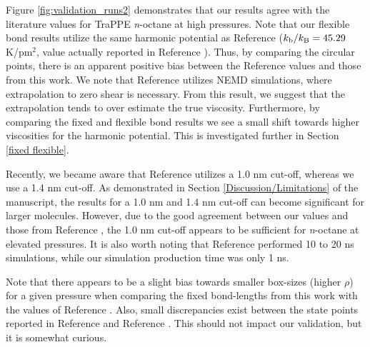 \documentclass[preprint,review,11pt]{elsarticle}
\begin{document}
	Figure \ref{fig:validation_runs2} demonstrates that our results agree with the literature values for TraPPE \textit{n}-octane at high pressures. Note that our flexible bond results utilize the same harmonic potential as Reference  ($k_{\rm b}/k_{\rm B} = 45.29$ K/pm$^2$, value actually reported in Reference ). Thus, by comparing the circular points, there is an apparent positive bias between the Reference  values and those from this work. We note that Reference  utilizes NEMD simulations, where extrapolation to zero shear is necessary. From this result, we suggest that the extrapolation tends to over estimate the true viscosity. Furthermore, by comparing the fixed and flexible bond results we see a small shift towards higher viscosities for the harmonic potential. This is investigated further in Section \ref{fixed flexible}.
	
	
	
	Recently, we became aware that Reference  utilizes a 1.0 nm cut-off, whereas we use a 1.4 nm cut-off. As demonstrated in Section \ref{Discussion/Limitations} of the manuscript, the results for a 1.0 nm and 1.4 nm cut-off can become significant for larger molecules. However, due to the good agreement between our values and those from Reference , the 1.0 nm cut-off appears to be sufficient for \textit{n}-octane at elevated pressures. It is also worth noting that Reference  performed 10 to 20 ns simulations, while our simulation production time was only 1 ns.
	
	Note that there appears to be a slight bias towards smaller box-sizes (higher $\rho$) for a given pressure when comparing the fixed bond-lengths from this work with the values of Reference . Also, small discrepancies exist between the state points reported in Reference  and Reference . This should not impact our validation, but it is somewhat curious. 
	
\end{document}
